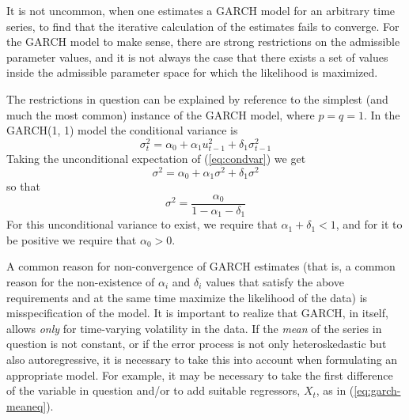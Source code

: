 It is not uncommon, when one estimates a GARCH model for an arbitrary
time series, to find that the iterative calculation of the estimates
fails to converge.  For the GARCH model to make sense, there are
strong restrictions on the admissible parameter values, and it is not
always the case that there exists a set of values inside the
admissible parameter space for which the likelihood is maximized.  

The restrictions in question can be explained by reference to the
simplest (and much the most common) instance of the GARCH model, where
$p = q = 1$.  In the GARCH(1, 1) model the conditional variance is
\begin{equation}
\label{eq:condvar}
\sigma^2_t = \alpha_0 + \alpha_1 u^2_{t-1} + \delta_1 \sigma^2_{t-1}
\end{equation}
Taking the unconditional expectation of (\ref{eq:condvar}) we get
\[
\sigma^2 = \alpha_0 + \alpha_1 \sigma^2 + \delta_1 \sigma^2
\]
so that
\[
\sigma^2 = \frac{\alpha_0}{1 - \alpha_1 - \delta_1}
\]
For this unconditional variance to exist, we require that $\alpha_1 +
\delta_1 < 1$, and for it to be positive we require that $\alpha_0 > 0$.

A common reason for non-convergence of GARCH estimates (that is, a
common reason for the non-existence of $\alpha_i$ and $\delta_i$ values
that satisfy the above requirements and at the same time maximize the
likelihood of the data) is misspecification of the model.  It is
important to realize that GARCH, in itself, allows \textit{only} for
time-varying volatility in the data.  If the \textit{mean} of the
series in question is not constant, or if the error process is not
only heteroskedastic but also autoregressive, it is necessary to take
this into account when formulating an appropriate model.  For example,
it may be necessary to take the first difference of the variable in
question and/or to add suitable regressors, $X_t$, as in
(\ref{eq:garch-meaneq}).


